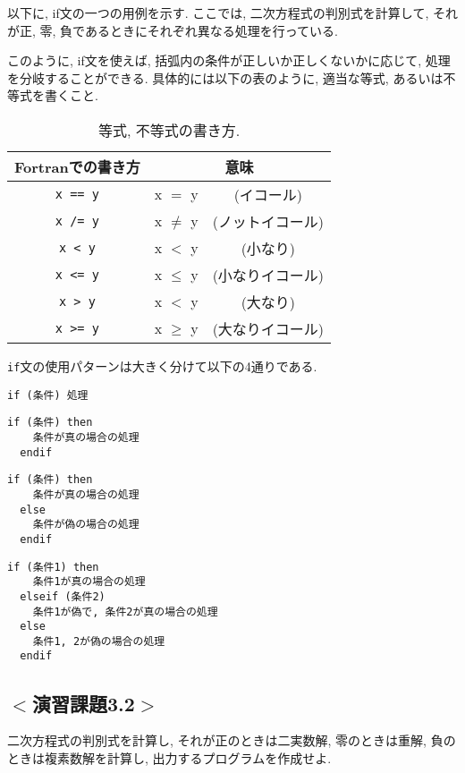 以下に, {\ttfamily if}文の一つの用例を示す.
ここでは, 二次方程式の判別式を計算して, それが正, 零, 負であるときにそれぞれ異なる処理を行っている.



このように, {\ttfamily if}文を使えば, 括弧内の条件が正しいか正しくないかに応じて, 処理を分岐することができる.
具体的には以下の表のように, 適当な等式, あるいは不等式を書くこと.

\begin{table}[h]
  \caption{等式, 不等式の書き方. }
  \begin{center}
    \begin{tabular}{ccc}
      \hline
      Fortranでの書き方   & \multicolumn{2}{c}{意味} \\ \hline
      \verb|x == y|   & x $=$ y &(イコール)\\
      \verb|x /= y|   & x $\ne$ y &(ノットイコール)\\
      \verb|x < y|    & x $<$ y &(小なり)\\
      \verb|x <= y|   & x $\le$ y &(小なりイコール)\\
      \verb|x > y|    & x $<$ y &(大なり)\\
      \verb|x >= y|   & x $\ge$ y &(大なりイコール)\\ \hline
    \end{tabular}
  \end{center}
\end{table}

\verb|if|文の使用パターンは大きく分けて以下の4通りである.
\begin{Verbatim}[frame=single]
  if (条件) 処理
\end{Verbatim}
\begin{Verbatim}[frame=single]
  if (条件) then
    条件が真の場合の処理
  endif
\end{Verbatim}
\begin{Verbatim}[frame=single]
  if (条件) then
    条件が真の場合の処理
  else
    条件が偽の場合の処理
  endif
\end{Verbatim}
\begin{Verbatim}[frame=single]
  if (条件1) then
    条件1が真の場合の処理
  elseif (条件2)
    条件1が偽で, 条件2が真の場合の処理
  else
    条件1, 2が偽の場合の処理
  endif
\end{Verbatim}




\subsection*{$<$演習課題3.2$>$}
二次方程式の判別式を計算し, それが正のときは二実数解,
零のときは重解, 負のときは複素数解を計算し, 出力するプログラムを作成せよ.


